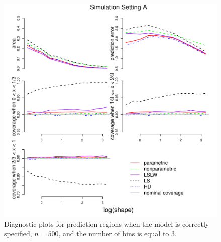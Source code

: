 \documentclass[11pt]{article}\usepackage[]{graphicx}\usepackage[]{color}
\makeatletter
\def\maxwidth{ %
  \ifdim\Gin@nat@width>\linewidth
    \linewidth
  \else
    \Gin@nat@width
  \fi
}
\newenvironment{knitrout}{}{} %
\makeatother
\begin{document}
\newpage
\begin{figure}[h!]
\begin{center}
\begin{knitrout}
\color{fgcolor}
\includegraphics[width=\maxwidth]{figure/Fig-gamma-500-1} 

\end{knitrout}
\end{center}
\caption{Diagnostic plots for prediction regions when the model is correctly 
  specified, $n = 500$, and the number of bins is equal to $3$.}
\label{Fig:gamma.500}
\end{figure}
\end{document}
